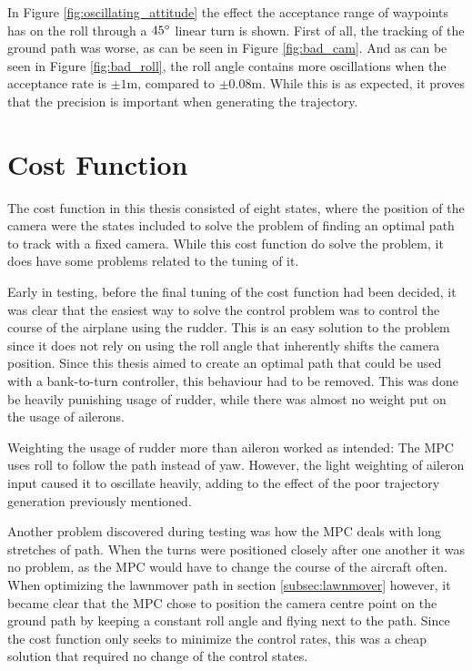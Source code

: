 In Figure \ref{fig:oscillating_attitude} the effect the acceptance range of waypoints has on the roll through a $45\degree$ linear turn is shown. First of all, the tracking of the ground path was worse, as can be seen in Figure \ref{fig:bad_cam}. And as can be seen in Figure \ref{fig:bad_roll}, the roll angle contains more oscillations when the acceptance rate is $\pm 1$m, compared to $\pm 0.08$m. While this is as expected, it proves that the precision is important when generating the trajectory.

\section{Cost Function}

The cost function in this thesis consisted of eight states, where the position of the camera were the states included to solve the problem of finding an optimal path to track with a fixed camera. While this cost function do solve the problem, it does have some problems related to the tuning of it.

Early in testing, before the final tuning of the cost function had been decided, it was clear that the easiest way to solve the control problem was to control the course of the airplane using the rudder. This is an easy solution to the problem since it does not rely on using the roll angle that inherently shifts the camera position. Since this thesis aimed to create an optimal path that could be used with a bank-to-turn controller, this behaviour had to be removed. This was done be heavily punishing usage of rudder, while there was almost no weight put on the usage of ailerons.

Weighting the usage of rudder more than aileron worked as intended: The MPC uses roll to follow the path instead of yaw. However, the light weighting of aileron input caused it to oscillate heavily, adding to the effect of the poor trajectory generation previously mentioned.

Another problem discovered during testing was how the MPC deals with long stretches of path. When the turns were positioned closely after one another it was no problem, as the MPC would have to change the course of the aircraft often. When optimizing the lawnmover path in section \ref{subsec:lawnmover} however, it became clear that the MPC chose to position the camera centre point on the ground path by keeping a constant roll angle and flying next to the path. Since the cost function only seeks to minimize the control rates, this was a cheap solution that required no change of the control states.

